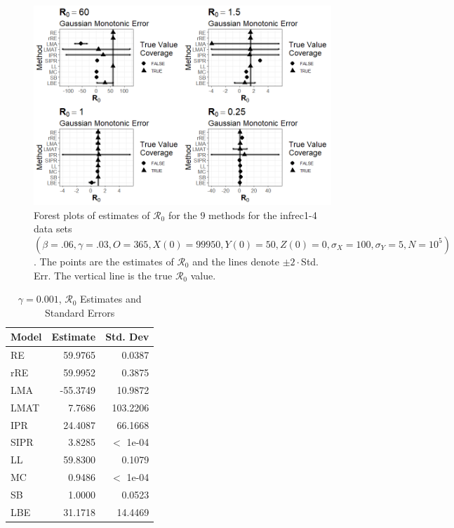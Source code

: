 \documentclass[12pt]{article}
\newcommand{\xxsir}{\ensuremath{9} } %
\newcommand{\rr}{\ensuremath{\mathcal{R}_0}}
\begin{document}
\begin{figure}[H]
	\centering
	\includegraphics[scale=0.5]{images/parchange_nm.tiff}
	\caption{Forest plots of estimates of $\rr$ for the \xxsir methods for the infrec1-4 data sets $(\beta=.06, \gamma=.03, O=365, X(0)=99950, Y(0)=50, Z(0)=0, \sigma_X=100, \sigma_Y=5, N=10^5)$.  The points are the estimates of $\rr$ and the lines denote $\pm 2\cdot $Std. Err.  The vertical line is the true $\rr$ value.}
\end{figure}
\begin{table}[H]
	
	\centering
	\begin{tabular}[t]{l|r|r}
		\hline
		Model & Estimate & Std. Dev\\
		\hline
		RE & 59.9765 & 0.0387\\
		\hline
		rRE & 59.9952 & 0.3875\\
		\hline
		LMA & -55.3749 & 10.9872\\
		\hline
		LMAT & 7.7686 & 103.2206\\
		\hline
		IPR & 24.4087 & 66.1668\\
		\hline
		SIPR & 3.8285 & $<$ 1e-04\\
		\hline
		LL & 59.8300 & 0.1079\\
		\hline
		MC & 0.9486 & $<$ 1e-04\\
		\hline
		SB & 1.0000 & 0.0523\\
		\hline
		LBE & 31.1718 & 14.4469\\
		\hline
	\end{tabular}
	\caption{$\gamma = 0.001$, $\rr$ Estimates and Standard Errors}
\end{table}
\end{document}

